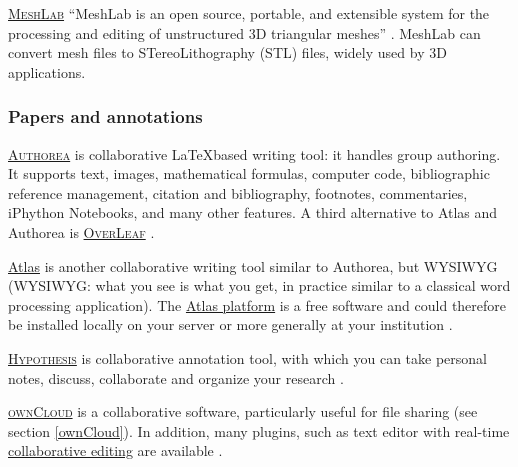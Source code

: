 \vspace{0.4cm}

\noindent {} \textsc{\href{http://meshlab.sourceforge.net/}{MeshLab}}  ``MeshLab is an open source, portable, and extensible system for the processing and editing of unstructured 3D triangular meshes'' \cite{meshlab.sf.net_meshlab_2015}. MeshLab can convert mesh files to STereoLithography (STL) files, widely used by 3D applications.


\subsubsection{Papers and annotations}

\label{angrpatd}

\noindent {} \textsc{\href{https://www.authorea.com/}{Authorea}} is collaborative \LaTeX based writing tool: it handles group authoring. It supports text, images, mathematical formulas, computer code, bibliographic reference management, citation and bibliography, footnotes, commentaries, iPhython Notebooks, and many other features.   A third alternative to Atlas and Authorea is \textsc{\href{https://www.overleaf.com/}{OverLeaf}} \cite{authorea_authorea:_2015,oreilley_getting-started--atlas_2015}.

\vspace{0.4cm}

\noindent {} \href{http://atlas.oreiley.com}{Atlas} is another collaborative writing tool similar to Authorea, but WYSIWYG (WYSIWYG: what you see is what you get, in practice similar to a classical word processing application). The \href{https://github.com/oreillymedia/Getting-Started-with-Atlas}{Atlas platform} is a free software and could therefore be installed locally on your server or more generally at your institution \cite{oreilly_atlas_2015,authorea_authorea:_2015,oreilley_getting-started--atlas_2015}.

\vspace{0.4cm}

\noindent {} \textsc{\href{https://hypothes.is}{Hypothesis}} is collaborative annotation tool, with which you can take personal notes, discuss, collaborate and organize your research \cite{hypothes.is_hypothesis_2015}.

\vspace{0.4cm}

\noindent {} \textsc{\href{http://owncloud.org}{ownCloud}} is a collaborative software, particularly useful for file sharing (see section \ref{ownCloud}). In addition, many plugins, such as text editor with real-time \href{https://www.youtube.com/watch?v=xsqSLeppxm0}{collaborative editing} are available \cite{owncloud_owncloud.org_2015}. 

